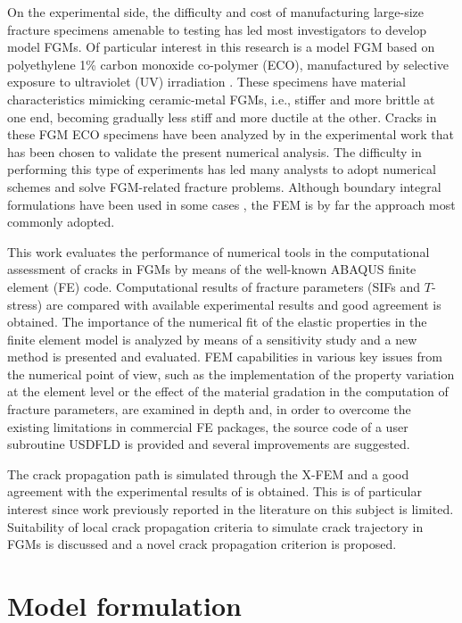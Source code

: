 On the experimental side, the difficulty and cost of manufacturing large-size fracture specimens amenable to testing has led most investigators to develop model FGMs. Of particular interest in this research is a model FGM based on polyethylene 1\% carbon monoxide co-polymer (ECO), manufactured by selective exposure to ultraviolet (UV) irradiation \citep{Lambros1999}. These specimens have material characteristics mimicking ceramic-metal FGMs, i.e., stiffer and more brittle at one end, becoming gradually less stiff and more ductile at the other. Cracks in these FGM ECO specimens have been analyzed by \cite{Abanto-Bueno2006} in the experimental work that has been chosen to validate the present numerical analysis. The difficulty in performing this type of experiments has led many analysts to adopt numerical schemes and solve FGM-related fracture problems. Although boundary integral formulations have been used in some cases \citep{Zhang2003,Riveiro2013}, the FEM is by far the approach most commonly adopted.

This work evaluates the performance of numerical tools in the computational assessment of cracks in FGMs by means of the well-known ABAQUS finite element (FE) code. Computational results of fracture parameters (SIFs and $T$-stress) are compared with available experimental results and good agreement is obtained. The importance of the numerical fit of the elastic properties in the finite element model is analyzed by means of a sensitivity study and a new method is presented and evaluated. FEM capabilities in various key issues from the numerical point of view, such as the implementation of the property variation at the element level or the effect of the material gradation in the computation of fracture parameters, are examined in depth and, in order to overcome the existing limitations in commercial FE packages, the source code of a user subroutine USDFLD is provided and several improvements are suggested.
 
The crack propagation path is simulated through the X-FEM and a good agreement with the experimental results of \cite{Abanto-Bueno2006} is obtained. This is of particular interest since work previously reported in the literature on this subject is limited. Suitability of local crack propagation criteria to simulate crack trajectory in FGMs is discussed and a novel crack propagation criterion is proposed.

\section{Model formulation}
\label{sec:model}

